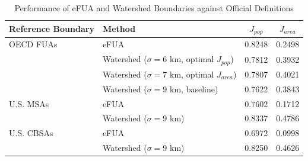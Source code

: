 \begin{table}[htbp]
\centering
\begin{tabular}{l l c c}
\hline
Reference Boundary & Method & $J_{pop}$ & $J_{area}$ \\
\hline
OECD FUAs & eFUA & 0.8248 & 0.2498 \\
          & Watershed ($\sigma=6$ km, optimal $J_{pop}$) & 0.7812 & 0.3932 \\
          & Watershed ($\sigma=7$ km, optimal $J_{area}$) & 0.7807 & 0.4021 \\
          & Watershed ($\sigma=9$ km, baseline) & 0.7622 & 0.3843 \\
\hline
U.S. MSAs  & eFUA & 0.7602 & 0.1712 \\
           & Watershed ($\sigma=9$ km) & 0.8337 & 0.4786 \\
\hline
U.S. CBSAs & eFUA & 0.6972 & 0.0998 \\
           & Watershed ($\sigma=9$ km) & 0.8250 & 0.4626 \\
\hline
\end{tabular}
\caption{Performance of eFUA and Watershed Boundaries against Official Definitions}
\label{tab:jaccard_comparison}
\end{table}
